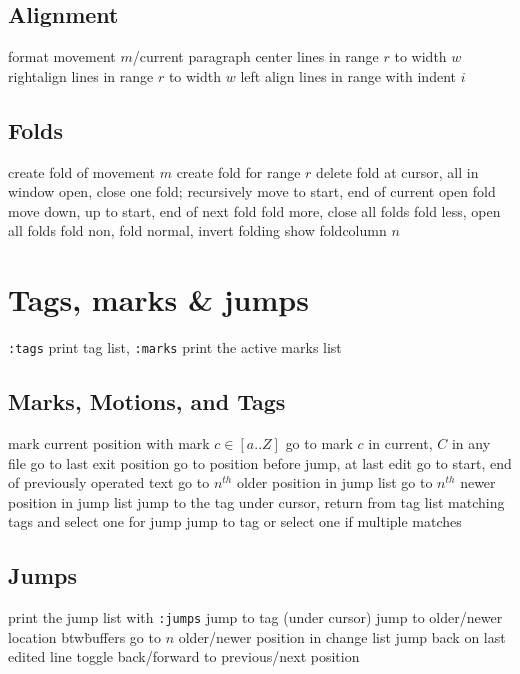 \subsection{Alignment}{}
	{format movement $m$/current paragraph}
	{center lines in range $r$ to width $w$}
	{rightalign lines in range $r$ to width $w$}
	{left align lines in range with indent $i$}

\subsection{Folds}	{}
	{create fold of movement $m$}
	{create fold for range $r$}
	{delete fold at cursor, all in window}
	{open, close one fold; recursively}
	{move to start, end of current open fold}
	{move down, up to start, end of next fold}
	{fold more, close all folds}
	{fold less, open all folds}
	{fold non, fold normal, invert folding}
	{show foldcolumn $n$}

\section{Tags, marks \& jumps}{{\tt :tags} print tag list, {\tt :marks} print the active marks list}
\subsection{Marks, Motions, and Tags}	{}
	{mark current position with mark $c\in[a..Z]$}
	{go to mark $c$ in current, $C$ in any file}
	{go to last exit position}
	{go to position before jump, at last edit}
	{go to start, end of previously operated text}
	{go to $n^{th}$ older position in jump list}
	{go to $n^{th}$ newer position in jump list}
\cmdS{\ctrl ] \ctrl T }	{jump to the tag under cursor, return from tag}
	{list matching tags and select one for jump}
	{jump to tag or select one if multiple matches}

\subsection{Jumps}	{print the jump list with {\tt :jumps}}
\cmdS{:ta \ctrl[ }	{jump to tag (under cursor)}
	{jump to older/newer location btw\. buffers}
	{go to $n$ older/newer position in change list}
	{jump back on last edited line}
	{toggle back/forward to previous/next position}

